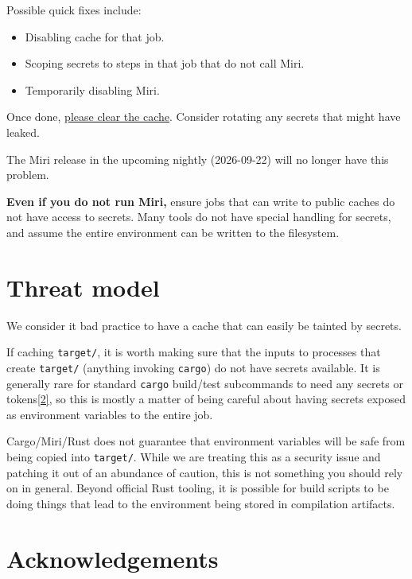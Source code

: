 \documentclass[11pt,a4paper]{article}
\begin{document}
Possible quick fixes include:

\begin{itemize}
\item Disabling cache for that job.
\item Scoping secrets to steps in that job that do not call Miri.
\item Temporarily disabling Miri.
\end{itemize}

Once done, \href{https://docs.github.com/en/actions/how-tos/manage-workflow-runs/manage-caches\#deleting-cache-entries}{please clear the cache}. Consider rotating any secrets that might have leaked.

The Miri release in the upcoming nightly (2026-09-22) will no longer have this problem.

\textbf{Even if you do not run Miri,} ensure jobs that can write to public caches do not have access to secrets. Many tools do not have special handling for secrets, and assume the entire environment can be written to the filesystem.

\section{Threat model}

We consider it bad practice to have a cache that can easily be tainted by secrets.

If caching \texttt{target/}, it is worth making sure that the inputs to processes that create \texttt{target/} (anything invoking \texttt{cargo}) do not have secrets available. It is generally rare for standard \texttt{cargo} build/test subcommands to need any secrets or tokens\href{https://blog.rust-lang.org/2026/09/21/github-actions-leaking-secrets-when-miri-output-is-cached/\#fn-2}{[2]}, so this is mostly a matter of being careful about having secrets exposed as environment variables to the entire job.

Cargo/Miri/Rust does not guarantee that environment variables will be safe from being copied into \texttt{target/}. While we are treating this as a security issue and patching it out of an abundance of caution, this is not something you should rely on in general. Beyond official Rust tooling, it is possible for build scripts to be doing things that lead to the environment being stored in compilation artifacts.

\section{Acknowledgements}
\end{document}
